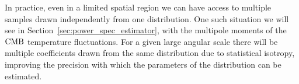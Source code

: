     In practice,
    even in a limited spatial region we can have access to multiple
    samples drawn independently from one distribution. One such situation
    we will see in Section~\ref{sec:power_spec_estimator},
    with the multipole moments of the $\text{CMB}$ temperature fluctuations.
    For a given large angular scale there will be multiple coefficients
    drawn from the same distribution due to statistical isotropy,
    improving the precision with which the parameters of the
    distribution can be estimated.






